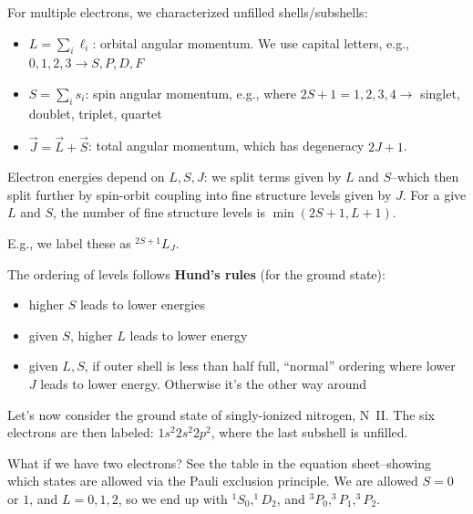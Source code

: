 \documentclass{tufte-handout}
\renewcommand{\textbf}[1]{{\bf \textcolor{dark-gray}{#1}}}
\renewcommand{\smallcaps}[1]{{\smaller~\textsc{#1}}}
\begin{document}
For multiple electrons, we characterized unfilled shells/subshells:
\begin{itemize}
\item $L = \sum_i \ell_i$: orbital angular momentum. We use capital letters, e.g., $0, 1, 2, 3 \rightarrow S, P, D, F$
\item $S = \sum_i s_i$: spin angular momentum, e.g., where $2S+1 = 1, 2, 3, 4 \rightarrow$ singlet, doublet, triplet, quartet
\item $\vec J = \vec L + \vec S$: total angular momentum, which has degeneracy $2 J + 1$.
\end{itemize}
Electron energies depend on $L, S, J$: we split terms given by $L$ and $S$--which then split further by spin-orbit coupling into fine structure levels given by $J$. For a give $L$ and $S$, the number of fine structure levels is $\min (2S+1, L+1)$.

E.g., we label these as $^{2S+1} L_J$.

The ordering of levels follows \textbf{Hund's rules} (for the ground state):
\begin{itemize}
\item higher $S$ leads to lower energies
\item given $S$, higher $L$ leads to lower energy
\item given $L, S$, if outer shell is less than half full, ``normal'' ordering where lower $J$ leads to lower energy. Otherwise it's the other way around
\end{itemize}

Let's now consider the ground state of singly-ionized nitrogen, N\smallcaps{II}. The six electrons are then labeled: $1s^2 2s^2 2p^2$, where the last subshell is unfilled. 

What if we have two electrons? See the table in the equation sheet--showing which states are allowed via the Pauli exclusion principle. We are allowed $S=0$ or $1$, and $L =  0, 1, 2$, so we end up with $^1 S_0, ^1D_2$, and $^3P_0, ^3P_1, ^3P_2$. 
\end{document}
